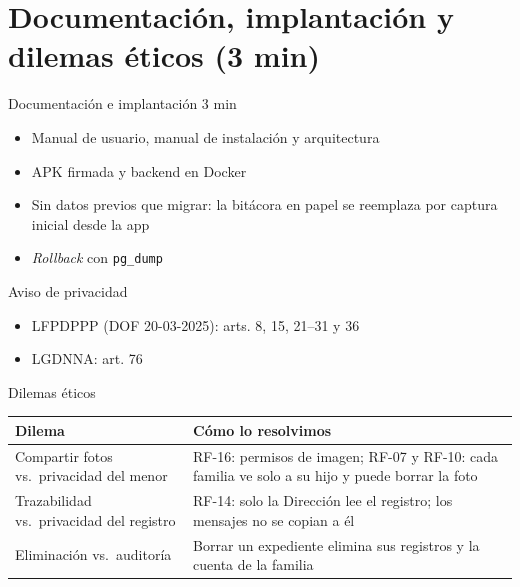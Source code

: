\section{Documentación, implantación y dilemas éticos (3 min)}

\begin{frame}{Documentación e implantación \hfill\small 3 min}
  \large
  \begin{itemize}
    \item Manual de usuario, manual de instalación y arquitectura
    \item APK firmada y backend en Docker
    \item Sin datos previos que migrar: la bitácora en papel se reemplaza por captura inicial desde la app
    \item \textit{Rollback} con \texttt{pg\_dump}
  \end{itemize}
\end{frame}

\begin{frame}{Aviso de privacidad}
  \large
  \begin{itemize}
    \item LFPDPPP (DOF 20-03-2025): arts. 8, 15, 21--31 y 36
    \item LGDNNA: art. 76
  \end{itemize}
\end{frame}

\begin{frame}{Dilemas éticos}
  \begin{tabular}{@{}>{\raggedright\arraybackslash}p{4.4cm}>{\raggedright\arraybackslash}p{8.8cm}@{}}
    \toprule
    \textbf{Dilema} & \textbf{Cómo lo resolvimos}\\
    \midrule
    Compartir fotos vs.\ privacidad del menor & RF-16: permisos de imagen; RF-07 y RF-10: cada familia ve solo a su hijo y puede borrar la foto\\[0.4em]
    Trazabilidad vs.\ privacidad del registro & RF-14: solo la Dirección lee el registro; los mensajes no se copian a él\\[0.4em]
    Eliminación vs.\ auditoría & Borrar un expediente elimina sus registros y la cuenta de la familia\\
    \bottomrule
  \end{tabular}
\end{frame}
